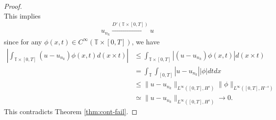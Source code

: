 \documentclass[12pt,reqno]{amsart}
\numberwithin{equation}{section}  %
\newcommand{\ci}{\mathbb{T}}
\begin{document}
\begin{proof}
\begin{equation}
      \end{equation}
      This implies
      \begin{equation*}
      \begin{split}
        u_{n_{k}} \xrightarrow{D'(\ci \times [0, T])} u
      \end{split}
      \end{equation*}
      since for any $\phi(x,t) \in C^{\infty}\left( \ci \times [0,T] \right)$,
      we have
      \begin{equation*}
      \begin{split}
        | \int_{\ci \times [0,T]} (u - u_{n_{k}}) \phi(x,t) d (x \times t) |
        & \le  \int_{\ci \times [0,T]} | (u - u_{n_{k}}) \phi(x,t)| d (x \times t) 
        \\
        & = \int_{\ci} \int_{[0,T]} | u - u_{n_{k}} | | \phi | dt dx
        \\
        & \le \| u - u_{n_{k}} \|_{L^{\infty}\left( [0,T], H^{s} \right)} \|
        \phi \|_{L^{\infty}\left( [0,T], H^{-s} \right)}
        \\
        & \simeq \| u - u_{n_{k}} \|_{L^{\infty}\left( [0,T], H^{s} \right)} \to
        0.
      \end{split}
      \end{equation*}
     This contradicts Theorem \ref{thm:cont-fail}.
    \end{proof}
%
%
%
%
%
%
%
%
\end{document}
